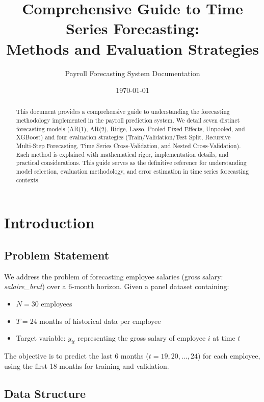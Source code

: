 \documentclass[12pt,a4paper]{article}
\title{\textbf{Comprehensive Guide to Time Series Forecasting:\\Methods and Evaluation Strategies}}
\author{Payroll Forecasting System Documentation}
\date{\today}
\begin{document}
\maketitle

\begin{abstract}
This document provides a comprehensive guide to understanding the forecasting methodology implemented in the payroll prediction system. We detail seven distinct forecasting models (AR(1), AR(2), Ridge, Lasso, Pooled Fixed Effects, Unpooled, and XGBoost) and four evaluation strategies (Train/Validation/Test Split, Recursive Multi-Step Forecasting, Time Series Cross-Validation, and Nested Cross-Validation). Each method is explained with mathematical rigor, implementation details, and practical considerations. This guide serves as the definitive reference for understanding model selection, evaluation methodology, and error estimation in time series forecasting contexts.
\end{abstract}

\tableofcontents
\newpage

\section{Introduction}

\subsection{Problem Statement}

We address the problem of forecasting employee salaries (gross salary: \textit{salaire\_brut}) over a 6-month horizon. Given a panel dataset containing:
\begin{itemize}
    \item $N = 30$ employees
    \item $T = 24$ months of historical data per employee
    \item Target variable: $y_{it}$ representing the gross salary of employee $i$ at time $t$
\end{itemize}

The objective is to predict the last 6 months ($t = 19, 20, \ldots, 24$) for each employee, using the first 18 months for training and validation.

\subsection{Data Structure}
\end{document}
